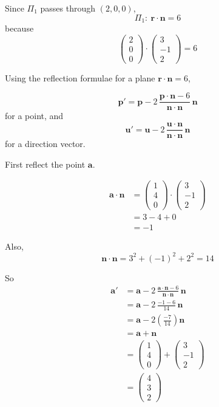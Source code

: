 \documentclass[leqno]{article}
\begin{document}
\begin{enumerate}[
  label=\textbf{\arabic*.},
  leftmargin=*,
  topsep=0pt,
  partopsep=0pt,
  parsep=0pt
]
\begin{tcolorbox}[colback=white, colframe=scarlet, title={\textbf{Solution}}, breakable, grow to left by=6mm, grow to right by=10mm]
\begin{enumerate}[label=\textbf{(\alph*)}]
Since $\Pi_1$ passes through $(2,0,0)$,
\[
\Pi_1:\ \mathbf r\cdot \mathbf n=6
\]
because
\[
\begin{pmatrix}2\\0\\0\end{pmatrix}\cdot \begin{pmatrix}3\\-1\\2\end{pmatrix}=6
\]

Using the reflection formulae for a plane $\mathbf r\cdot \mathbf n=6$,

\[
\mathbf p'
=
\mathbf p
-2\,\frac{\mathbf p\cdot\mathbf n-6}{\mathbf n\cdot\mathbf n}\,\mathbf n
\]
for a point, and
\[
\mathbf u'
=
\mathbf u
-2\,\frac{\mathbf u\cdot\mathbf n}{\mathbf n\cdot\mathbf n}\,\mathbf n
\]
for a direction vector.

First reflect the point $\mathbf a$.

\begin{align*}
\mathbf a\cdot\mathbf n
&=
\begin{pmatrix}1\\4\\0\end{pmatrix}\cdot
\begin{pmatrix}3\\-1\\2\end{pmatrix}\\
&=3-4+0\\
&=-1
\end{align*}

Also,
\[
\mathbf n\cdot\mathbf n=3^2+(-1)^2+2^2=14
\]

So
\begin{align*}
\mathbf a'
&=
\mathbf a
-2\,\frac{\mathbf a\cdot\mathbf n-6}{\mathbf n\cdot\mathbf n}\,\mathbf n\\
&=
\mathbf a
-2\,\frac{-1-6}{14}\,\mathbf n\\
&=
\mathbf a
-2\left(\frac{-7}{14}\right)\mathbf n\\
&=
\mathbf a+\mathbf n\\
&=
\begin{pmatrix}1\\4\\0\end{pmatrix}
+
\begin{pmatrix}3\\-1\\2\end{pmatrix}\\
&=
\begin{pmatrix}4\\3\\2\end{pmatrix}
\end{align*}


\end{enumerate}
\end{tcolorbox}
\end{enumerate}
\end{document}
